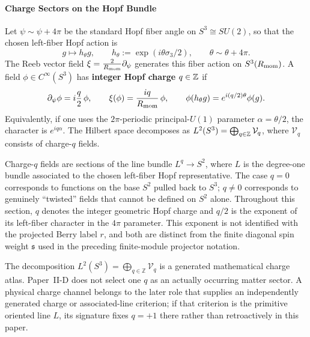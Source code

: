 \documentclass[12pt,a4paper]{article}
\begin{document}
\paragraph{Charge Sectors on the Hopf Bundle}

\begin{definition}
\label{p2:def:hopf-charge}
Let $\psi\sim\psi+4\pi$ be the standard Hopf fiber angle on
$S^3\cong SU(2)$, so that the chosen left-fiber Hopf action is
\[
 g\longmapsto h_\theta g,
 \qquad
 h_\theta:=\exp(i\theta\sigma_3/2),
 \qquad \theta\sim\theta+4\pi.
\]
The Reeb vector field $\xi = \frac{2}{R_{\mathrm{mom}}}\partial_\psi$ generates this fiber action on $S^3(R_{\mathrm{mom}})$. A field $\phi \in C^\infty(S^3)$ has \textbf{integer Hopf charge} $q \in \mathbb{Z}$ if
\begin{equation}
\partial_\psi \phi = i\frac{q}{2}\,\phi,
\qquad
\xi(\phi)=\frac{i q}{R_{\mathrm{mom}}}\,\phi,
\qquad
\phi(h_\theta g)=e^{i(q/2)\theta}\phi(g).
\label{p2:eq:hopf-charge-convention}
\end{equation}
Equivalently, if one uses the $2\pi$-periodic principal-$U(1)$ parameter $\alpha=\theta/2$, the character is $e^{iq\alpha}$.  The Hilbert space decomposes as $L^2(S^3) = \bigoplus_{q \in \mathbb{Z}} \mathcal{V}_q$, where $\mathcal{V}_q$ consists of charge-$q$ fields.
\end{definition}

\begin{remark}
Charge-$q$ fields are sections of the line bundle $L^q \to S^2$, where
$L$ is the degree-one bundle associated to the chosen left-fiber Hopf
representative. The case $q = 0$ corresponds to functions on the base $S^2$
pulled back to $S^3$; $q \neq 0$ corresponds to genuinely ``twisted'' fields
that cannot be defined on $S^2$ alone.  Throughout this section, $q$ denotes
the integer geometric Hopf charge and $q/2$ is the exponent of its
left-fiber character in the \(4\pi\) parameter.  This exponent is not
identified with the projected Berry label \(r\), and both are distinct from
the finite diagonal spin weight $\mathfrak s$ used in the preceding
finite-module projector notation.
\end{remark}

\begin{remark}
The decomposition
\(L^2(S^3)=\bigoplus_{q\in\mathbb Z}\mathcal V_q\) is a generated
mathematical charge atlas.  Paper~II-D does not select one \(q\) as an
actually occurring matter sector.  A physical charge channel belongs to the
later role that supplies an independently generated charge or associated-line
criterion; if that criterion is the primitive oriented line \(L\), its
signature fixes \(q=+1\) there rather than retroactively in this paper.
\end{remark}
\end{document}
